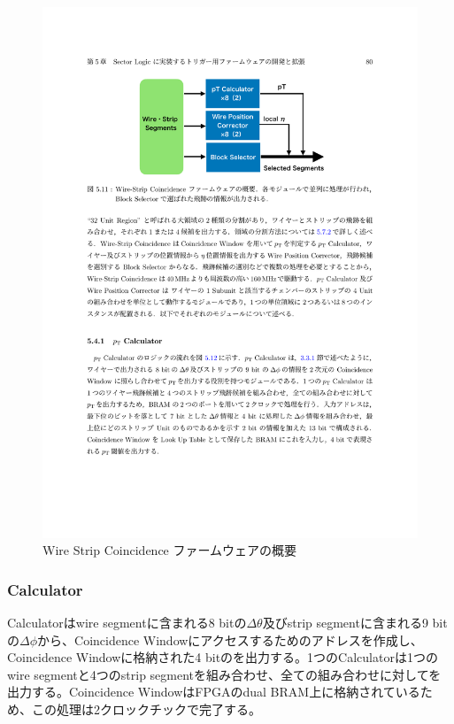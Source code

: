 \begin{figure} 
\centering
\includegraphics[width=16cm]{fig/SL/WS_logic.pdf}
\caption[Wire Strip Coincidence ファームウェアの概要]{Wire Strip Coincidence ファームウェアの概要\cite{mt_kawamoto}}
\label{WS_logic}
\end{figure}

\subsubsection*{\pt Calculator}
\pt Calculatorはwire segmentに含まれる8 bitの$\Delta\theta$及びstrip segmentに含まれる9 bitの$\Delta\phi$から、Coincidence Windowにアクセスするためのアドレスを作成し、Coincidence Windowに格納された4 bitの\pt を出力する。1つの\pt  Calculatorは1つのwire segmentと4つのstrip segmentを組み合わせ、全ての組み合わせに対して\pt を出力する。Coincidence WindowはFPGAのdual BRAM上に格納されているため、この処理は2クロックチックで完了する。


